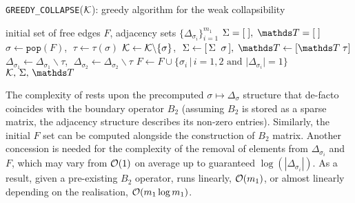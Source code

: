 \begin{algorithm}[h]
      \caption{ \texttt{GREEDY\_COLLAPSE}(\(\mathcal{K}\)):  greedy algorithm for the weak collapsibility
      \label{algo:greedy}}
      \begin{algorithmic}[1]
            \Require initial set of free edges \( F \), adjacency sets \(  \{ \Delta_{ \sigma_i } \}_{i=1}^{ m_1 } \)
             \State \( \Sigma = [ \; ] , \; \ds T = [ \; ] \) 
                  \State \( \sigma \gets \texttt{pop}( F ) \), \( \; \tau \gets \tau(\sigma)  \) 
                  \State \( \mathcal{K} \gets \mathcal{K} \backslash \{ \sigma \} \), \( \; \Sigma \gets [ \, \Sigma \;\; \sigma \, ] , \; \ds T \gets [ \ds T \; \tau ] \) 
                  \State \( \Delta_{\sigma_1} \gets \Delta_{\sigma_1} \backslash \tau  \), \( \; \Delta_{\sigma_2} \gets \Delta_{\sigma_2} \backslash \tau  \) 
                  \State \( F \gets F \cup \{ \sigma_i \, |  \, i = 1, 2 \text{ and } | \Delta_{\sigma_i} | = 1 \}  \) 
             \EndWhile
             \State \Return \( \mc K, \, \Sigma, \, \ds T \)
      \end{algorithmic}
\end{algorithm}

The complexity of  rests upon the precomputed \( \sigma \mapsto \Delta_\sigma \) structure that de-facto coincides with the boundary operator \( B_2 \) (assuming \( B_2 \) is stored as a sparse matrix, the adjacency structure describes its non-zero entries). Similarly, the initial \( F \) set can be computed alongside the construction of \( B_2 \) matrix. Another concession is needed for the complexity of the removal of elements from \( \Delta_{\sigma_i} \) and \( F \), which may vary from \( \mathcal{O} (1) \) on average up to guaranteed \( \log ( | \Delta_{\sigma_i} | ) \). As a result, given a pre-existing \( B_2 \) operator,  runs linearly, \( \mathcal{O} ( m_1  )\), or almost linearly depending on the realisation, \( \mathcal{O} ( m_1 \log m_1 )\).









